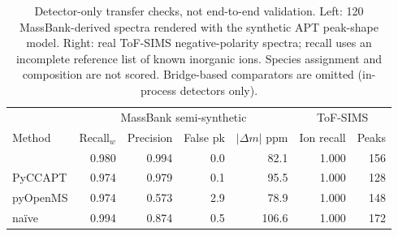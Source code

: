 \begin{table}[t]
\centering
\caption{Detector-only transfer checks, not end-to-end validation.
Left: 120 MassBank-derived spectra rendered with the synthetic APT
peak-shape model. Right: real ToF-SIMS negative-polarity spectra;
recall uses an incomplete reference list of known inorganic ions.
Species assignment and composition are not scored. Bridge-based
comparators are omitted (in-process detectors only).}
\label{tab:foreign}
\small
\begin{tabular}{lrrrr|rr}
\toprule
 & \multicolumn{4}{c|}{MassBank semi-synthetic} & \multicolumn{2}{c}{ToF-SIMS} \\
Method & Recall$_w$ & Precision & False pk & $|\Delta m|$ ppm & Ion recall & Peaks \\
\midrule
\rf{} & 0.980 & 0.994 & 0.0 & 82.1 & 1.000 & 156 \\
PyCCAPT & 0.974 & 0.979 & 0.1 & 95.5 & 1.000 & 128 \\
pyOpenMS & 0.974 & 0.573 & 2.9 & 78.9 & 1.000 & 148 \\
na\"ive & 0.994 & 0.874 & 0.5 & 106.6 & 1.000 & 172 \\
\bottomrule
\end{tabular}
\end{table}
